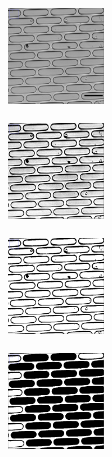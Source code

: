 \documentclass[pdftex,12pt,a4paper]{report}
\begin{document}
\begin{figure}[H]
\centering

\begin{subfigure}{\textwidth}
  \centering
  \includegraphics[width=0.28\textwidth]{images/trench_detect_1}
  \caption{}
  \label{fig:orig_pic}
\end{subfigure}%

\begin{subfigure}{\textwidth}
  \centering
  \includegraphics[width=0.28\textwidth]{images/trench_detect_2}
  \caption{}
  \label{fig:brcon_adj}
\end{subfigure}%

\begin{subfigure}{\textwidth}
  \centering
  \includegraphics[width=0.28\textwidth]{images/trench_detect_3}
  \caption{}
  \label{fig:rats}
\end{subfigure}%

\begin{subfigure}{\textwidth}
  \centering
  \includegraphics[width=0.28\textwidth]{images/trench_detect_4}
  \caption{}
  \label{fig:fill_holes}
\end{subfigure}%


\end{figure}
\end{document}
